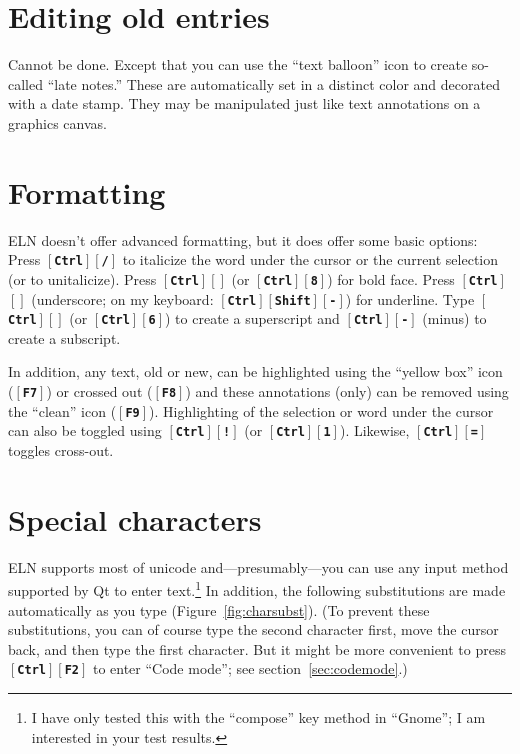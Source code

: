 \documentclass[11pt]{report}
\def\keystroke#1{$\left[\right.\!${\tt\bfseries #1}$\!\left.\right]$}
\def\key#1{\keystroke{#1}}
\def\keycombo#1#2{\keystroke{#1}\keystroke{#2}}
\def\keycontrol#1{\keycombo{Ctrl}{#1}}
\def\controlshift#1{\keystroke{Ctrl}\keystroke{Shift}\keystroke{#1}}
\def\keyctrlhat{\keycontrol{\char94}}
\def\keyctrlunderscore{\keycontrol{\char95}}
\begin{document}
\section{Editing old entries}

Cannot be done. Except that you can use the ``text balloon'' icon to
create so-called ``late notes.'' These are automatically set in a
distinct color and decorated with a date stamp. They
may be manipulated just like text annotations on a graphics canvas.

\section{Formatting}

ELN doesn't offer advanced formatting, but it does offer some basic
options: Press \keycontrol{/} to italicize the word under the
cursor or the current selection (or to unitalicize). Press
\keycontrol{*} (or \keycontrol{8}) for bold face. Press
\keyctrlunderscore{} (underscore; on my keyboard:
\controlshift{-}) for underline. Type
\keyctrlhat{} (or \keycontrol{6}) to create a
superscript and \keycontrol{-} (minus) to create a subscript.

In addition, any text, old or new, can be highlighted using the
``yellow box'' icon (\key{F7}) or crossed out (\key{F8}) and these
annotations (only) can be removed using the ``clean'' icon
(\key{F9}). Highlighting of the selection or word under the cursor can
also be toggled using \keycontrol{!} (or \keycontrol{1}). Likewise,
\keycontrol{=} toggles cross-out.

\section{Special characters}

ELN supports most of unicode and---presumably---you can use any input
method supported by Qt to enter text.\footnote{I have only tested this
  with the ``compose'' key method in ``Gnome''; I am interested in
  your test results.} In addition, the following substitutions are
made automatically as you type (Figure~\ref{fig:charsubst}).
(To prevent these  substitutions, you can of course type the
second character first, move the cursor back, and then type the first
character. But it might be more convenient to press \keycontrol{F2} to
enter ``Code mode''; see section~\ref{sec:codemode}.)
\end{document}

